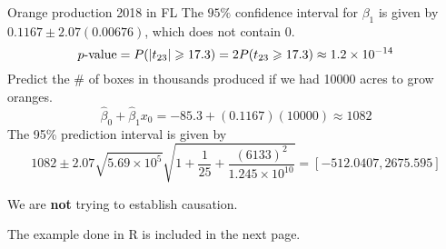 \begin{Example}{Orange production 2018 in FL}{}
    The $ 95\% $ confidence interval for $ \beta_1 $ is given by
    $ 0.1167\pm 2.07(0.00676) $,
    which does not contain $ 0 $.
    \[ p\text{-value}=P(\lvert t_{23}\rvert\geqslant 17.3)=
        2P(t_{23}\geqslant 17.3)\approx 1.2\times 10^{-14} \]
    Predict the \# of boxes in thousands produced if we had
    10000 acres to grow oranges.
    \[ \hat{\beta}_0+\hat{\beta}_1x_0=-85.3+(0.1167)(10000)\approx 1082 \]
    The 95\% prediction interval is given by
    \[ 1082\pm 2.07\sqrt{5.69\times 10^5}\sqrt{1+\frac{1}{25}+
        \frac{(6133)^2}{1.245\times 10^{10}} }=
            [-512.0407, 2675.595] \]
    \begin{Remark}{}{}
        We are \textbf{not} trying to establish causation.
    \end{Remark}
\end{Example}
The example done in R is included in the next page.

